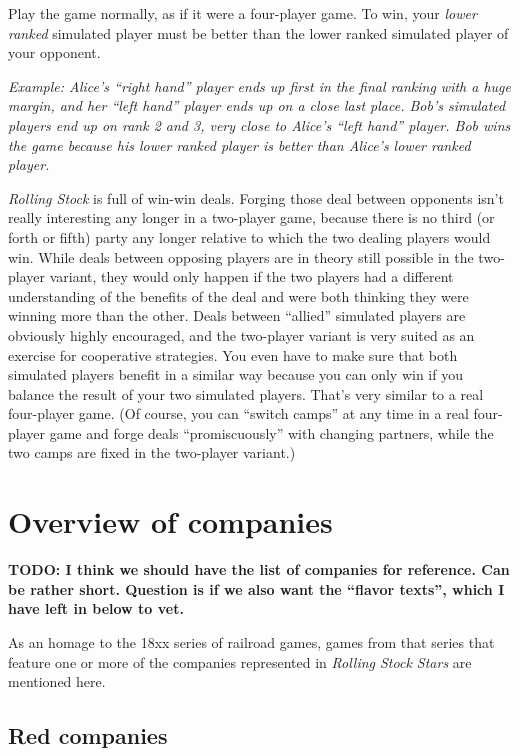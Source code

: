 \documentclass[10pt,final]{report}
\begin{document}
\begin{multicols}{2}
Play the game normally, as if it were a four-player game. To win, your
\emph{lower ranked} simulated player must be better than the lower
ranked simulated player of your opponent.

\emph{Example: Alice's ``right hand'' player ends up first in the
  final ranking with a huge margin, and her ``left hand'' player ends
  up on a close last place. Bob's simulated players end up on rank 2
  and 3, very close to Alice's ``left hand'' player. Bob wins the game
  because his lower ranked player is better than Alice's lower ranked
  player.}

\emph{Rolling Stock} is full of win-win deals. Forging those deal
between opponents isn't really interesting any longer in a two-player
game, because there is no third (or forth or fifth) party any longer
relative to which the two dealing players would win. While deals
between opposing players are in theory still possible in the
two-player variant, they would only happen if the two players had a
different understanding of the benefits of the deal and were both
thinking they were winning more than the other. Deals between
``allied'' simulated players are obviously highly encouraged, and the
two-player variant is very suited as an exercise for cooperative
strategies. You even have to make sure that both simulated players
benefit in a similar way because you can only win if you balance the
result of your two simulated players. That's very similar to a real
four-player game. (Of course, you can ``switch camps'' at any time in
a real four-player game and forge deals ``promiscuously'' with
changing partners, while the two camps are fixed in the two-player
variant.)
\end{multicols}

\chapter{Overview of companies}

\textbf{TODO: I think we should have the list of companies for
  reference. Can be rather short. Question is if we also want the
  ``flavor texts'', which I have left in below to vet.}

As an homage to the 18xx series of railroad games, games from that
series that feature one or more of the companies represented in
\emph{Rolling Stock Stars} are mentioned here.

\section{Red companies}
\end{document}
